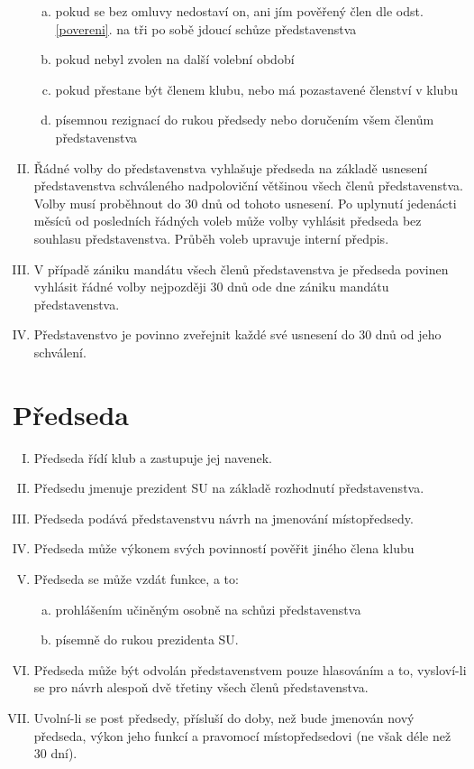 \documentclass[10pt]{article}
\begin{document}
\begin{enumerate}[I.]
		\begin{enumerate}[a.]
		\item pokud se bez omluvy nedostaví on, ani jím pověřený člen dle odst. \ref{povereni}. na tři po sobě jdoucí schůze představenstva
		\item pokud nebyl zvolen na další volební období
		\item pokud přestane být členem klubu, nebo má pozastavené členství v klubu
		\item písemnou rezignací do rukou předsedy nebo doručením všem členům představenstva
		\end{enumerate}
	\item Řádné volby do představenstva vyhlašuje předseda na základě usnesení představenstva schváleného nadpoloviční většinou všech členů představenstva. Volby musí proběhnout do 30 dnů od tohoto usnesení. Po uplynutí jedenácti měsíců od posledních řádných voleb může volby vyhlásit předseda bez souhlasu představenstva. Průběh voleb upravuje interní předpis.
	\item V případě zániku mandátu všech členů představenstva je předseda povinen vyhlásit řádné volby nejpozději 30 dnů ode dne zániku mandátu představenstva.
	\item Představenstvo je povinno zveřejnit každé své usnesení do 30 dnů od jeho schválení.
	\end{enumerate}

\section{Předseda} %
	\begin{enumerate}[I.]
	\item Předseda řídí klub a zastupuje jej navenek.  
	\item Předsedu jmenuje prezident SU na základě rozhodnutí představenstva.
	\item Předseda podává představenstvu návrh na jmenování místopředsedy.
	\item Předseda může výkonem svých povinností pověřit jiného člena klubu
	\item Předseda se může vzdát funkce, a to:  
		\begin{enumerate}[a.]
		\item prohlášením učiněným osobně na schůzi představenstva
		\item písemně do rukou prezidenta SU.  
		\end{enumerate}
	\item Předseda může být odvolán představenstvem pouze hlasováním a to, vysloví-li se pro návrh alespoň dvě třetiny všech členů představenstva. 
	\item Uvolní-li se post předsedy, přísluší do doby, než bude jmenován nový předseda, výkon jeho funkcí a pravomocí místopředsedovi (ne však déle než 30 dní).
	\end{enumerate}
\end{document}
